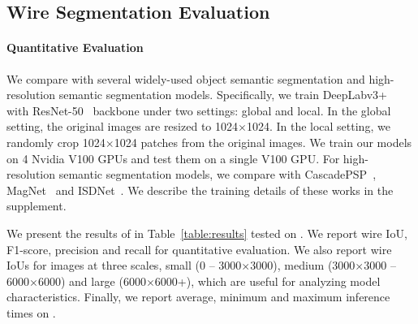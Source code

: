 \subsection{Wire Segmentation Evaluation}
\paragraph{Quantitative Evaluation}


We compare with several widely-used object semantic segmentation and high-resolution semantic segmentation models. Specifically, we train DeepLabv3+~\cite{deeplabv3p} with ResNet-50~\cite{resnet} backbone under two settings: global and local. In the global setting, the original images are resized to 1024$\times$1024. In the local setting, we randomly crop 1024$\times$1024 patches from the original images. We train our models on 4 Nvidia V100 GPUs and test them on a single V100 GPU. For high-resolution semantic segmentation models, we compare with CascadePSP~\cite{cascadepsp}, MagNet~\cite{magnet} and ISDNet~\cite{isdnet}. We describe the training details of these works in the supplement.

We present the results of in Table~\ref{table:results} tested on \benchmark. We report wire IoU, F1-score, precision and recall for quantitative evaluation. We also report wire IoUs for images at three scales, small (0 -- 3000$\times$3000), medium (3000$\times$3000 -- 6000$\times$6000) and large (6000$\times$6000+), which are useful for analyzing model characteristics. Finally, we report average, minimum and maximum inference times on \benchmark.



